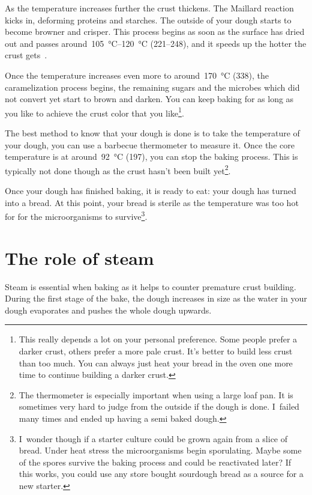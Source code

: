 As the temperature increases further the crust thickens. The Maillard reaction
kicks in, deforming proteins and starches. The outside of your dough starts to
become browner and crisper. This process begins as soon as the surface has
dried out and passes around~\qtyrange{105}{120}{\degreeCelsius}
(\qtyrange{221}{248}{\degF}), and it speeds up the hotter the crust
gets~\cite{purlis+browning}.

Once the temperature increases even more to around~\qty{170}{\degreeCelsius}
(\qty{338}{\degF}),
the caramelization process begins, the remaining sugars and the microbes which
did not convert yet start to brown and darken. You can keep baking
for as long as you like to achieve the crust color that you
like\footnote{This really depends a lot on your personal preference.
Some people prefer a darker crust, others prefer a more pale crust.
It's better to build less crust than too much. You can always just
heat your bread in the oven one more time to continue building a
darker crust.}.

The best method to know that your dough is done is to take
the temperature of your dough, you can use a barbecue thermometer
to measure it. Once the core temperature is at around~\qty{92}{\degreeCelsius}
(\qty{197}{\degF}),
you can stop the baking process. This is typically not done though
as the crust hasn't been built yet\footnote{The thermometer is
especially important when using a large loaf pan. It is sometimes
very hard to judge from the outside if the dough is done. I~failed
many times and ended up having a semi baked dough.}.

Once your dough has finished baking, it is ready to eat: your
dough has turned into a bread. At this
point, your bread is sterile as the temperature was too hot for
for the microorganisms to survive\footnote{I~wonder though
if a starter culture could be grown again from a slice of bread.
Under heat stress the microorganisms begin sporulating. Maybe
some of the spores survive the baking process and could be reactivated
later? If this works, you could use any store bought sourdough
bread as a source for a new starter.}.

\section{The role of steam}
Steam is essential when baking as it helps to counter premature
crust building. During the first stage of the bake, the dough
increases in size as the water in your dough evaporates and pushes
the whole dough upwards.

